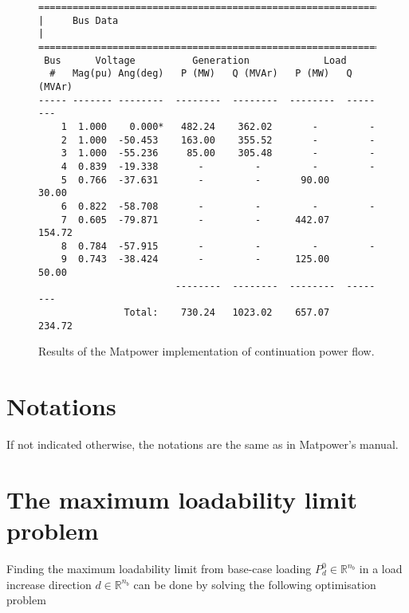 \documentclass[12pt,a4]{article}
\newcommand*{\field}[1]{\mathbb{#1}}
\newcommand*{\R}{\field{R}} %
\newcommand*{\matpower}{{\sc Matpower}}
\begin{document}
\begin{figure}[!h]
  \centering
\begin{verbatim}
================================================================================
|     Bus Data                                                                 |
================================================================================
 Bus      Voltage          Generation             Load        
  #   Mag(pu) Ang(deg)   P (MW)   Q (MVAr)   P (MW)   Q (MVAr)
----- ------- --------  --------  --------  --------  --------
    1  1.000    0.000*   482.24    362.02       -         -   
    2  1.000  -50.453    163.00    355.52       -         -   
    3  1.000  -55.236     85.00    305.48       -         -   
    4  0.839  -19.338       -         -         -         -   
    5  0.766  -37.631       -         -       90.00     30.00 
    6  0.822  -58.708       -         -         -         -   
    7  0.605  -79.871       -         -      442.07    154.72 
    8  0.784  -57.915       -         -         -         -   
    9  0.743  -38.424       -         -      125.00     50.00 
                        --------  --------  --------  --------
               Total:    730.24   1023.02    657.07    234.72
\end{verbatim}  
  \caption{Results of the \matpower{} implementation of continuation power flow.}\label{fig:res-ieee9-cpf}
\end{figure}

\section{Notations}
\label{sec:notations}

If not indicated otherwise, the notations are the same as in \matpower{}'s manual.

\section{The maximum loadability limit problem}
\label{sec:maxim-load-limit}

Finding the maximum loadability limit from base-case loading $P_d^0 \in \R^{n_b}$ in a load increase direction $d \in \R^{n_b}$ can be done by solving the following optimisation problem
\end{document}
